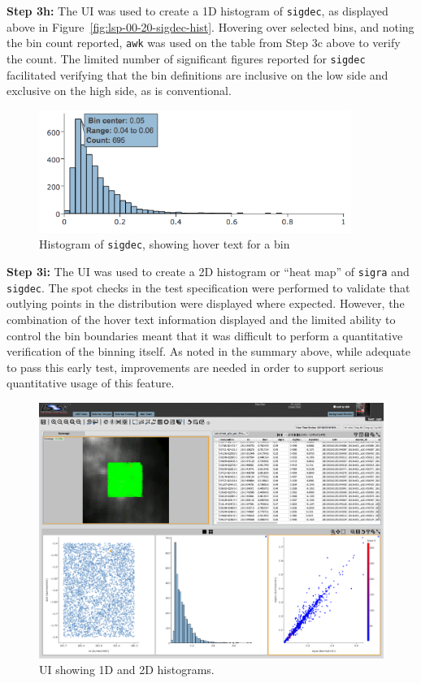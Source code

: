 \textbf{Step 3h:} The UI was used to create a 1D histogram of \verb|sigdec|, as displayed above in Figure~\ref{fig:lsp-00-20-sigdec-hist}.
Hovering over selected bins, and noting the bin count reported, \verb|awk| was used on the table from Step 3c above to verify the count.
The limited number of significant figures reported for \verb|sigdec| facilitated verifying that the bin definitions are inclusive on the low side and exclusive on the high side, as is conventional.

\begin{figure}
  \centering
  \includegraphics[width=4in]{lsp-00-20/step3-h-hover.png}
  \caption{Histogram of \texttt{sigdec}, showing hover text for a bin}
  \label{fig:lsp-00-20-sigdec-hist-hover}
\end{figure}

\textbf{Step 3i:} The UI was used to create a 2D histogram or ``heat map'' of \verb|sigra| and \verb|sigdec|.
The spot checks in the test specification were performed to validate that outlying points in the distribution were displayed where expected.
However, the combination of the hover text information displayed and the limited ability to control the bin boundaries meant that it was difficult to perform a quantitative verification of the binning itself.
As noted in the summary above, while adequate to pass this early test, improvements are needed in order to support serious quantitative usage of this feature.

\begin{figure}
  \includegraphics[width=\linewidth]{lsp-00-20/step3-i.png}
  \caption{UI showing 1D and 2D histograms.}
  \label{fig:lsp-00-20-2Dhist}
\end{figure}

